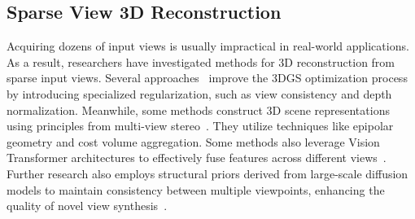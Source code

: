 \documentclass[lettersize,journal]{IEEEtran}
\begin{document}

\subsection{Sparse View 3D Reconstruction}
Acquiring dozens of input views is usually impractical in real-world applications. As a result, researchers have investigated methods for 3D reconstruction from sparse input views. Several approaches~\cite{niemeyer2022regnerf, truong2023sparf, zhang2024cor, li2024dngaussian, han2024binocular} improve the 3DGS optimization process by introducing specialized regularization, such as view consistency and depth normalization. 
Meanwhile, some methods construct 3D scene representations using principles from multi-view stereo~\cite{pixelsplat, mvsnerf, chen2023explicit, szymanowicz2024flash3d, xu2024murf, mvsplat}. They utilize techniques like epipolar geometry and cost volume aggregation. Some methods also leverage Vision Transformer architectures to effectively fuse features across different views~\cite{noposplat}.
Further research also employs structural priors derived from large-scale diffusion models to maintain consistency between multiple viewpoints, enhancing the quality of novel view synthesis~\cite{gao2024cat3d, wu2024reconfusion, zhang2024gs, liu20243dgs, liu2024one, chen2024mvsplat360}. 
\end{document}
